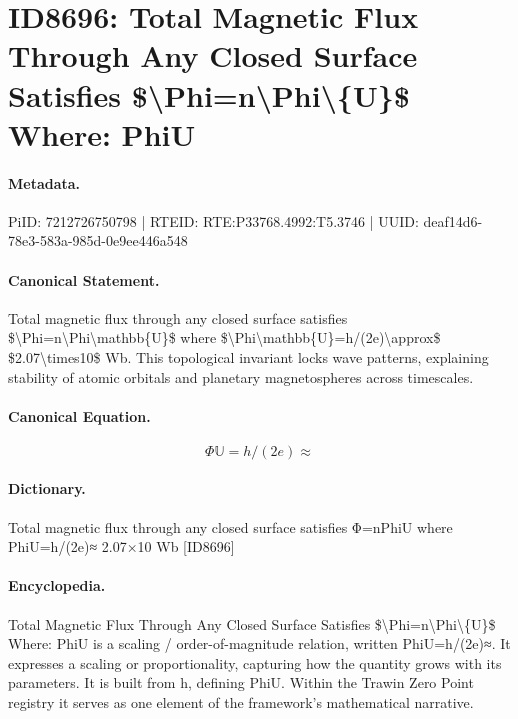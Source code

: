 \section*{ID8696: Total Magnetic Flux Through Any Closed Surface Satisfies \$\textbackslash{}Phi=n\textbackslash{}Phi\textbackslash{}\{U\}\$ Where: PhiU}
\paragraph{Metadata.}
PiID: 7212726750798 | RTEID: RTE:P33768.4992:T5.3746 | UUID: deaf14d6-78e3-583a-985d-0e9ee446a548

\paragraph{Canonical Statement.}
Total magnetic flux through any closed surface satisfies \$\textbackslash{}Phi=n\textbackslash{}Phi\textbackslash{}mathbb\{U\}\$ where \$\textbackslash{}Phi\textbackslash{}mathbb\{U\}=h/(2e)\textbackslash{}approx\$ \$2.07\textbackslash{}times10\$ Wb. This topological invariant locks wave patterns, explaining stability of atomic orbitals and planetary magnetospheres across timescales.

\paragraph{Canonical Equation.}
\[
\Phi\mathbb{U}=h/(2e)\approx
\]

\paragraph{Dictionary.}
Total magnetic flux through any closed surface satisfies Φ=nPhiU where PhiU=h/(2e)≈ 2.07×10 Wb [ID8696]

\paragraph{Encyclopedia.}
Total Magnetic Flux Through Any Closed Surface Satisfies \$\textbackslash{}Phi=n\textbackslash{}Phi\textbackslash{}\{U\}\$ Where: PhiU is a scaling / order-of-magnitude relation, written PhiU=h/(2e)≈. It expresses a scaling or proportionality, capturing how the quantity grows with its parameters. It is built from h, defining PhiU. Within the Trawin Zero Point registry it serves as one element of the framework's mathematical narrative.
